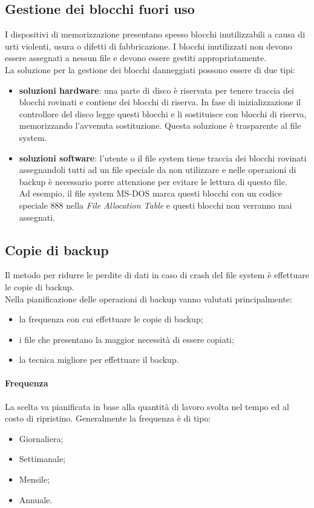 \documentclass[12pt, letterpaper]{report}
\begin{document}
	\subsection{Gestione dei blocchi fuori uso}
	I dispositivi di memorizzazione presentano spesso blocchi inutilizzabili a causa di urti violenti, usura o difetti di fabbricazione. I blocchi inutilizzati non devono essere assegnati a nessun file e devono essere gestiti appropriatamente. \\
	La soluzione per la gestione dei blocchi danneggiati possono essere di due tipi:
	\begin{itemize}
		\item \textbf{soluzioni hardware}: una parte di disco è riservata per tenere traccia dei blocchi rovinati e contiene dei blocchi di riserva. In fase di inizializzazione il controllore del disco legge questi blocchi e li sostituisce con blocchi di riserva, memorizzando l'avvenuta sostituzione. Questa soluzione è trasparente al file system.
		\item \textbf{soluzioni software}: l'utente o il file system tiene traccia dei blocchi rovinati assegnandoli tutti ad un file speciale da non utilizzare e nelle operazioni di backup è necessario porre attenzione per evitare le lettura di questo file. \\
		Ad esempio, il file system MS-DOS marca questi blocchi con un codice speciale 888 nella \textit{File Allocation Table} e questi blocchi non verranno mai assegnati.
	\end{itemize}
	\subsection{Copie di backup}
	Il metodo per ridurre le perdite di dati in caso di crash del file system è effettuare le copie di backup. \\
	Nella pianificazione delle operazioni di backup vanno valutati principalmente:
	\begin{itemize}
		\item la frequenza con cui effettuare le copie di backup;
		\item i file che presentano la maggior necessità di essere copiati;
		\item la tecnica migliore per effettuare il backup.
	\end{itemize}
	\paragraph{Frequenza} La scelta va pianificata in base alla quantità di lavoro svolta nel tempo ed al costo di ripristino. Generalmente la frequenza è di tipo:
	\begin{itemize}
		\item Giornaliera;
		\item Settimanale;
		\item Mensile;
		\item Annuale.
	\end{itemize}
\end{document}
